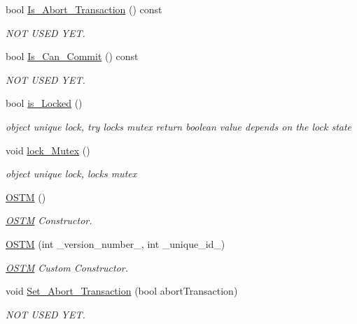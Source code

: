 \begin{DoxyCompactItemize}
bool \hyperlink{class_o_s_t_m_afc2851abf5342c3c67342c2c14820115_afc2851abf5342c3c67342c2c14820115}{Is\+\_\+\+Abort\+\_\+\+Transaction} () const 
\begin{DoxyCompactList}\small\item\em N\+OT U\+S\+ED Y\+ET. \end{DoxyCompactList}\item 
bool \hyperlink{class_o_s_t_m_a8df39ced3b401aa466df97e26d14b1b7_a8df39ced3b401aa466df97e26d14b1b7}{Is\+\_\+\+Can\+\_\+\+Commit} () const 
\begin{DoxyCompactList}\small\item\em N\+OT U\+S\+ED Y\+ET. \end{DoxyCompactList}\item 
bool \hyperlink{class_o_s_t_m_afb6520023ed2c4a6188b688c46f192d0_afb6520023ed2c4a6188b688c46f192d0}{is\+\_\+\+Locked} ()
\begin{DoxyCompactList}\small\item\em object unique lock, try locks mutex return boolean value depends on the lock state \end{DoxyCompactList}\item 
void \hyperlink{class_o_s_t_m_af192c598a3c647f37aaba5757e60240f_af192c598a3c647f37aaba5757e60240f}{lock\+\_\+\+Mutex} ()
\begin{DoxyCompactList}\small\item\em object unique lock, locks mutex \end{DoxyCompactList}\item 
\hyperlink{class_o_s_t_m_a968edf778668bd0ec7603f0571619196_a968edf778668bd0ec7603f0571619196}{O\+S\+TM} ()
\begin{DoxyCompactList}\small\item\em \hyperlink{class_o_s_t_m}{O\+S\+TM} Constructor. \end{DoxyCompactList}\item 
\hyperlink{class_o_s_t_m_a2314f55a127b94aa8a51d19ba798401e_a2314f55a127b94aa8a51d19ba798401e}{O\+S\+TM} (int \+\_\+version\+\_\+number\+\_\+, int \+\_\+unique\+\_\+id\+\_\+)
\begin{DoxyCompactList}\small\item\em \hyperlink{class_o_s_t_m}{O\+S\+TM} Custom Constructor. \end{DoxyCompactList}\item 
void \hyperlink{class_o_s_t_m_aba384cf65c5f56f5b86833730c3c6ea4_aba384cf65c5f56f5b86833730c3c6ea4}{Set\+\_\+\+Abort\+\_\+\+Transaction} (bool abort\+Transaction)
\begin{DoxyCompactList}\small\item\em N\+OT U\+S\+ED Y\+ET. \end{DoxyCompactList}\item 

\end{DoxyCompactItemize}

